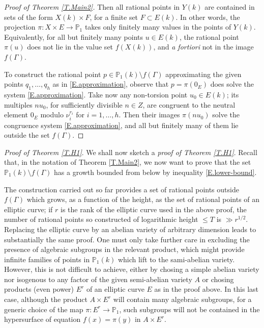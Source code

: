 \documentclass[leqno,12pt]{article} %
\def\P{{{\mathbb P}}}
\theoremstyle{plain} %
\theoremstyle{definition} %
\begin{document}
\begin{proof}[ Proof of Theorem \ref{T.Main2}]
Then all rational points in $Y(k)$ are contained in sets of the form $X(k)\times F$, for a finite set $F\subset E(k)$. In other words, the projection $\pi: X\times E \to \P_1$ takes only finitely many values in the points of $Y(k)$. Equivalently, for all but finitely many points $u\in E(k)$, the rational point $\pi(u)$ does not lie in the value set $f(X(k))$, and {\it a fortiori} not in the image $f(\Gamma)$. 

To construct the rational point $p\in \P_1(k)\setminus f(\Gamma)$ approximating the given points $q_1,\ldots,q_h$ as in \eqref{E.approximation}, observe that $p=\pi(0_E)$ does solve the system \eqref{E.approximation}. Take now any non-torsion point $u_0\in E(k)$; its multiples $nu_0$, for sufficiently divisible $n\in Z$, are congruent to the neutral element $0_E$ modulo $\nu_i^{r_i}$ for $i=1,\ldots,h$. Then their images $\pi(nu_0)$ solve the congruence system \eqref{E.approximation}, and all but finitely many of them lie outside the set $f(\Gamma)$.

\end{proof}


{\it Proof of Theorem \ref{T.H1}}.  We shall now sketch a  {\it proof of Theorem \ref{T.H1}}. Recall that, in the notation of Theorem \ref{T.Main2}, we now want to prove that the set $\P_1(k)\setminus f(\Gamma)$ has a growth bounded from below by inequality \eqref{E.lower-bound}. 

The construction carried out so far provides a set of rational points outside $f(\Gamma)$ which grows, as a function of the height, as the set of rational points of an elliptic curve; if $r$ is the rank of the elliptic curve used in the above proof, the number of rational points so constructed of logarithmic height   $\leq T$ is $\gg r^{1/2}$. Replacing the elliptic curve by an abelian variety of arbitrary dimension leads to substantially the same proof. One must only take further care in excluding the presence of algebraic subgroups in the relevant product, which might provide infinite families of points in $\P_1(k)$ which lift to the sami-abelian variety. However, this is not difficult to achieve, either by chosing a simple abelian variety nor isogenous to any factor of the given  semi-abelian variety $A$ or chosing products (even power) $E^r$ of an elliptic curve $E$ as in the proof above. In this last case, although the product  $A\times E^r$ will contain many algebraic subgroups, for a generic choice of the map $\pi:E^r\to \P_1$, such subgroups will not be contained in the hypersurface of equation $f(x)=\pi(y)$ in $A\times E^r$.
\end{document}
